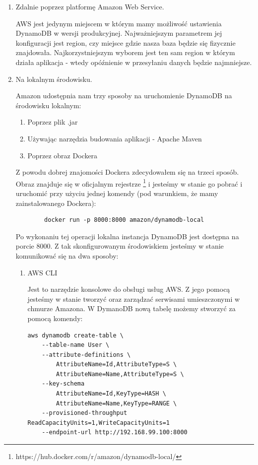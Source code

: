 \begin{enumerate}
    \item Zdalnie poprzez platformę Amazon Web Service.
    
    AWS jest jedynym miejscem w którym mamy możliwość ustawienia DynamoDB w wersji produkcyjnej. Najważniejszym parametrem jej konfiguracji jest region, czy miejsce gdzie nasza baza będzie się fizycznie znajdowała. Najkorzystniejszym wyborem jest ten sam region w którym działa aplikacja - wtedy opóźnienie w przesyłaniu danych będzie najmniejsze.
    
    \item Na lokalnym środowisku.
    
    Amazon udostępnia nam trzy sposoby na uruchomienie DynamoDB na środowisku lokalnym:
    
    \begin{enumerate}
        \item Poprzez plik .jar
        \item Używając narzędzia budowania aplikacji - Apache Maven
        \item Poprzez obraz Dockera
    \end{enumerate}
    
    Z powodu dobrej znajomości Dockera zdecydowałem się na trzeci sposób. Obraz znajduje się w oficjalnym rejestrze \footnote{https://hub.docker.com/r/amazon/dynamodb-local/} i jesteśmy w stanie go pobrać i uruchomić przy użyciu jednej komendy (pod warunkiem, że mamy zainstalowanego Dockera):
    
    \begin{verbatim}
        docker run -p 8000:8000 amazon/dynamodb-local
    \end{verbatim}
    
    Po wykonaniu tej operacji lokalna instancja DynamoDB jest dostępna na porcie 8000. Z tak skonfigurowanym środowiskiem jesteśmy w stanie komunikować się na dwa sposoby:
    
    \begin{enumerate}
        \item AWS CLI
        
        Jest to narzędzie konsolowe do obsługi usług AWS. Z jego pomocą jesteśmy w stanie tworzyć oraz zarządzać serwisami umieszczonymi w chmurze Amazona. W DymanoDB nową tabelę możemy stworzyć za pomocą komendy:
        
        \begin{verbatim}
aws dynamodb create-table \
    --table-name User \
    --attribute-definitions \
        AttributeName=Id,AttributeType=S \
        AttributeName=Name,AttributeType=S \
    --key-schema 
        AttributeName=Id,KeyType=HASH \
        AttributeName=Name,KeyType=RANGE \
    --provisioned-throughput ReadCapacityUnits=1,WriteCapacityUnits=1
    --endpoint-url http://192.168.99.100:8000
        \end{verbatim}
        

\end{enumerate}
\end{enumerate}
